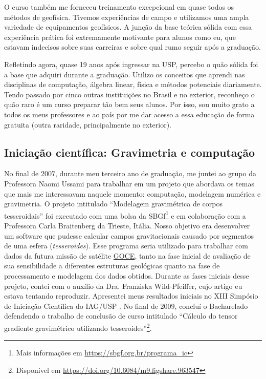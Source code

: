 \documentclass[10pt,a4paper,oneside]{book}
\begin{document}
O curso também me forneceu treinamento excepcional em quase todos os métodos de
geofísica.
Tivemos experiências de campo e utilizamos uma ampla variedade de equipamentos
geofísicos.
A junção da base teórica sólida com essa experiência prática foi
extremamente motivante para alunos como eu, que estavam indecisos sobre suas
carreiras e sobre qual rumo seguir após a graduação.

Refletindo agora, quase 19 anos após ingressar na USP, percebo o quão sólida
foi a base que adquiri durante a graduação. Utilizo os conceitos que aprendi
nas disciplinas de computação, álgebra linear, física e métodos potenciais
diariamente. Tendo passado por cinco outras instituições no Brasil e no
exterior, reconheço o quão raro é um curso preparar tão bem seus alunos.
Por isso, sou muito grato a todos os meus professores e ao país por me dar
acesso a essa educação de forma gratuita (outra raridade, principalmente no
exterior).

\subsection{Iniciação científica: Gravimetria e computação}
\label{sec_ic_tesseroids}

No final de 2007, durante meu terceiro ano de graduação, me juntei ao grupo da
Professora Naomi Ussami para trabalhar em um projeto que abordava os temas que
mais me interessavam naquele momento: computação, modelagem numérica e
gravimetria.
O projeto intitulado ``Modelagem gravimétrica de corpos tesseroidais'' foi
executado com uma bolsa da
SBGf\footnote{Mais informações em \url{https://sbgf.org.br/programa_ic}}
e em colaboração com a Professora Carla Braitenberg da Trieste, Itália.
Nosso objetivo era desenvolver um software que pudesse calcular campos
gravitacionais causado por segmentos de uma esfera (\textit{tesseroides}).
Esse programa seria utilizado para trabalhar com dados da futura missão de
satélite \href{https://www.esa.int/Enabling_Support/Operations/GOCE}{GOCE},
tanto na fase inicial de avaliação de sua sensibilidade a diferentes estruturas
geológicas quanto na fase de processamento e modelagem dos dados obtidos.
Durante as fases iniciais desse projeto, contei com o auxílio da Dra.
Franziska Wild-Pfeiffer, cujo artigo \citep{WildPfeiffer2008} eu estava
tentando reproduzir.
Apresentei meus resultados iniciais no XIII Simpósio de Iniciação Científica do
IAG/USP \citep{Uieda2008}.
No final de 2009, concluí o Bacharelado defendendo o trabalho de conclusão de
curso intitulado ``Cálculo do tensor gradiente gravimétrico utilizando
tesseroides''\footnote{Disponível em \url{https://doi.org/10.6084/m9.figshare.963547}}.
\end{document}
